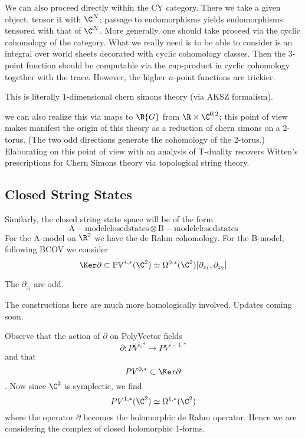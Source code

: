 \documentclass[12pt]{amsart}
\begin{document}
  \begin{rmk}
    We can also proceed directly within the CY category. There we take a given
    object, tensor it with $\C^N$; passage to endomorphisms yields
    endomorphisms tensored with that of $\C^N$. More generally, one should take
    proceed via the cyclic cohomology of the category. What we really need is
    to be able to consider is an integral over world sheets decorated with
    cyclic cohomology classes. Then the 3-point function should be computable
    via the cup-product in cyclic cohomology together with the trace. However,
    the higher $n$-point functions are trickier.
  \end{rmk}

  \begin{rmk}
    This is literally 1-dimensional chern simons theory (via AKSZ formalism).
  \end{rmk}

  \begin{rmk}
    we can also realize this via maps to $\B{G}$ from $\R\times \C^{0|2}$; this
    point of view makes manifest the origin of this theory as a reduction of chern simons on a
  2-torus. (The two odd directions generate the cohomology of the 2-torus.)
  Elaborating on this point of view with an analysis of T-duality recovers
  Witten's prescriptions for Chern Simons theory via topological string theory.
  \end{rmk}

  \subsection{Closed String States}
  Similarly, the closed string state space will be of the form
  $$\mathrm{A-model closed states}\otimes \mathrm{B-model closed
  states}$$
  For the A-model on $\R^2$ we have the de Rahm cohomology.
  For the B-model, following BCOV we consider $$\Ker \partial \subset
  \mbf{PV}^{*,*}(\C^2) \simeq
  \Omega^{0,*}(\C^2)[\partial_{z_1},\partial_{z_2}]$$

  \begin{rmk}
    The $\partial_{z_i}$ are odd.
  \end{rmk}

  \begin{rmk}
    The constructions here are much more homologically involved. Updates coming soon.
  \end{rmk}

  Observe that the action of $\partial$ on PolyVector fields $$\partial :
  PV^{i,*} \rightarrow PV^{i-1,*}$$
  and that $$PV^{0,*}\subset \Ker\partial$$. Now since $\C^2$ is symplectic, we
  find$$PV^{1,*}(\C^2) \simeq
  \Omega^{1,*}(\C^2)$$ where the operator $\partial$ becomes the holomorphic de
  Rahm operator. Hence we are considering the complex of
  closed\footnotemark{} holomorphic
  1-forms.
\end{document}
